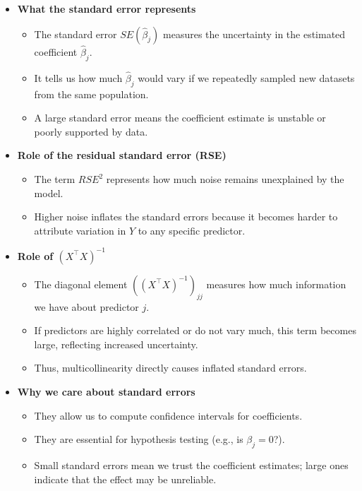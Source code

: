\documentclass[10pt,a4paper]{article}
\begin{document}
	\begin{itemize}

		\item \textbf{What the standard error represents}
		\begin{itemize}
			\item The standard error $SE(\hat{\beta}_j)$ measures the uncertainty in the estimated coefficient $\hat{\beta}_j$.
			\item It tells us how much $\hat{\beta}_j$ would vary if we repeatedly sampled new datasets from the same population.
			\item A large standard error means the coefficient estimate is unstable or poorly supported by data.
		\end{itemize}

		\item \textbf{Role of the residual standard error (RSE)}
		\begin{itemize}
			\item The term $RSE^2$ represents how much noise remains unexplained by the model.
			\item Higher noise inflates the standard errors because it becomes harder to attribute variation in $Y$ to any specific predictor.
		\end{itemize}

		\item \textbf{Role of $(X^\top X)^{-1}$}
		\begin{itemize}
			\item The diagonal element $\left( (X^\top X)^{-1} \right)_{jj}$ measures how much information we have about predictor $j$.
			\item If predictors are highly correlated or do not vary much, this term becomes large, reflecting increased uncertainty.
			\item Thus, multicollinearity directly causes inflated standard errors.
		\end{itemize}

		\item \textbf{Why we care about standard errors}
		\begin{itemize}
			\item They allow us to compute confidence intervals for coefficients.
			\item They are essential for hypothesis testing (e.g., is $\beta_j = 0$?).
			\item Small standard errors mean we trust the coefficient estimates; large ones indicate that the effect may be unreliable.
		\end{itemize}

	\end{itemize}
\end{document}

